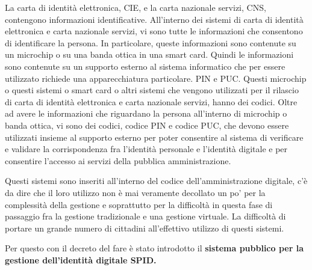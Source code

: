  La carta di identità elettronica, CIE, e la carta nazionale servizi, CNS, contengono informazioni identificative. All'interno dei sistemi di carta di identità elettronica e carta nazionale servizi, vi sono tutte le informazioni che consentono di identificare la persona. In particolare, queste informazioni sono contenute su un microchip o su una banda ottica in una smart card. Quindi le informazioni sono contenute su un supporto esterno al sistema informatico che per essere utilizzato richiede una apparecchiatura particolare. 
 PIN e PUC. Questi microchip o questi sistemi o smart card o altri sistemi che vengono utilizzati per il rilascio di carta di identità elettronica e carta nazionale servizi, hanno dei codici. Oltre ad avere le informazioni che riguardano la persona all'interno di microchip o banda ottica, vi sono dei codici, codice PIN e codice PUC, che devono essere utilizzati insieme al supporto esterno per poter consentire al sistema di verificare e validare la corrispondenza fra l'identità personale e l'identità digitale e per consentire l'accesso ai servizi della pubblica amministrazione. \par
 Questi sistemi sono inseriti all'interno del codice dell'amministrazione digitale, c'è da dire che il loro utilizzo non è mai veramente decollato un po' per la complessità della gestione e soprattutto per la difficoltà in questa fase di passaggio fra la gestione tradizionale e una gestione virtuale. La difficoltà di portare un grande numero di cittadini all'effettivo utilizzo di questi sistemi. \par
 Per questo con il decreto del fare è stato introdotto il \textbf{sistema pubblico per la gestione dell'identità digitale SPID.}\par 
 
